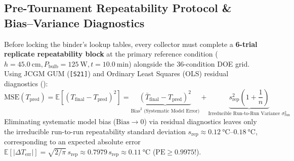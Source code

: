\subsection{Pre-Tournament Repeatability Protocol \& Bias--Variance Diagnostics}
Before locking the binder's lookup tables, every collector must complete a \textbf{6-trial replicate repeatability block} at the primary reference condition ($h = \SI{45.0}{\centi\meter}, P_{\mathrm{bulb}} = \SI{125}{\watt}, t = \SI{10.0}{\minute}$) alongside the 36-condition DOE grid. Using JCGM GUM (\texttt{[S21]}) and Ordinary Least Squares (OLS) residual diagnostics ():
\begin{equation}\label{eq:16:mse-bias-var}
  \mathrm{MSE}(T_{\mathrm{pred}}) = \mathbb{E}\!\left[(T_{\mathrm{final}} - T_{\mathrm{pred}})^2\right] = \underbrace{\left(\bar{T}_{\mathrm{final}} - T_{\mathrm{pred}}\right)^2}_{\mathrm{Bias}^2\text{ (Systematic Model Error)}} + \underbrace{s_{\mathrm{rep}}^2\left(1 + \frac{1}{n}\right)}_{\text{Irreducible Run-to-Run Variance }\sigma_{\mathrm{run}}^2}
\end{equation}
Eliminating systematic model bias ($\mathrm{Bias} \to 0$) via residual diagnostics leaves only the irreducible run-to-run repeatability standard deviation $s_{\mathrm{rep}} \approx \SIrange{0.12}{0.18}{\celsius}$, corresponding to an expected absolute error $\mathbb{E}[|\Delta T_{\mathrm{err}}|] = \sqrt{2/\pi}\,s_{\mathrm{rep}} \approx 0.7979\,s_{\mathrm{rep}} \approx \SI{0.11}{\celsius}$ ($\mathrm{PE} \ge 0.9975$!).

